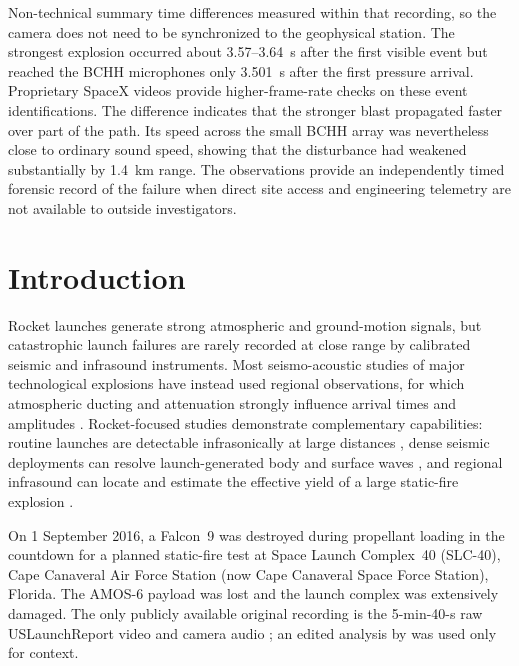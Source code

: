 \documentclass[]{seismica}
\begin{document}
{\begin{summary}{Non-technical summary}
  time differences measured within that recording, so the camera does not need
  to be synchronized to the geophysical station. The strongest explosion
  occurred about 3.57--3.64~s after the first visible event but reached the
  BCHH microphones only 3.501~s after the first pressure arrival. Proprietary
  SpaceX videos provide higher-frame-rate checks on these event identifications.
  The difference indicates that the stronger blast propagated faster over part
  of the path.
  Its speed across the small BCHH array was nevertheless close to ordinary
  sound speed, showing that the disturbance had weakened substantially by
  1.4~km range. The observations provide an independently timed forensic record
  of the failure when direct site access and engineering telemetry are not
  available to outside investigators.
  \end{summary}
}

\section{Introduction}
\label{sec:introduction}

Rocket launches generate strong atmospheric and ground-motion signals, but
catastrophic launch failures are rarely recorded at close range by calibrated
seismic and infrasound instruments. Most seismo-acoustic studies of major
technological explosions have instead used regional observations, for which
atmospheric ducting and attenuation strongly influence arrival times and
amplitudes \citep{ottemoller_2008,green_2008,ceranna_2009,smink_2019,
pilger_beirut_2021,kim_pasyanos_2022}. Rocket-focused studies demonstrate
complementary capabilities: routine launches are detectable infrasonically at
large distances \citep{pilger_rocket_2021}, dense seismic deployments can
resolve launch-generated body and surface waves
\citep{schuster_rocketquake_2025}, and regional infrasound can locate and
estimate the effective yield of a large static-fire explosion
\citep{silber_scamfer_newglenn_2026}.

On 1 September 2016, a Falcon~9 was destroyed during propellant loading in the
countdown for a planned static-fire test at Space Launch Complex~40 (SLC-40),
Cape Canaveral Air Force Station (now Cape Canaveral Space Force Station),
Florida. The AMOS-6 payload was lost and the launch complex was extensively
damaged. The only publicly available original recording is the 5-min-40-s raw
USLaunchReport video and camera audio \citep{uslaunchreport_amos6_video_2016};
an edited analysis by \citet{manley_spacex_explosion_2016} was used only for
context. 
\end{document}
